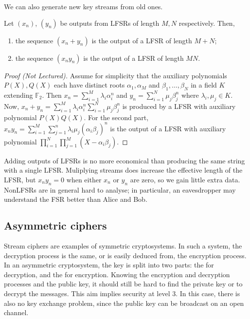 
We can also generate new key streams from old ones.
\begin{lemma}
    Let $(x_n)$, $(y_n)$ be outputs from LFSRs of length $M, N$ respectively.
    Then,
    \begin{enumerate}
        \item the sequence $(x_n + y_n)$ is the output of a LFSR of length $M + N$;
        \item the sequence $(x_n y_n)$ is the output of a LFSR of length $MN$.
    \end{enumerate}
\end{lemma}

\begin{proof}[Proof (Not Lectured)]
    Assume for simplicity that the auxiliary polynomials $P(X), Q(X)$ each have distinct roots $\alpha_1, \alpha_M$ and $\beta_1, \dots, \beta_N$ in a field $K$ extending $\mathbb F_2$.
    Then $x_n = \sum_{i=1}^M \lambda_i \alpha_i^n$ and $y_n = \sum_{i=1}^N \mu_j \beta_j^n$ where $\lambda_i, \mu_j \in K$.
    Now, $x_n + y_n = \sum_{i=1}^M \lambda_i \alpha_i^n \sum_{i=1}^N \mu_j \beta_j^n$ is produced by a LFSR with auxiliary polynomial $P(X) Q(X)$.
    For the second part, $x_n y_n = \sum_{i=1}^M \sum_{j=1}^n \lambda_i \mu_j (\alpha_i \beta_j)^n$ is the output of a LFSR with auxiliary polynomial $\prod_{i=1}^N \prod_{j=1}^M (X - \alpha_i \beta_j)$.
\end{proof}
Adding outputs of LFSRs is no more economical than producing the same string with a single LFSR.
Muliplying streams does increase the effective length of the LFSR, but $x_n y_n = 0$ when either $x_n$ or $y_n$ are zero, so we gain little extra data.
NonLFSRs are in general hard to analyse; in particular, an eavesdropper may understand the FSR better than Alice and Bob.

\subsection{Asymmetric ciphers}
Stream ciphers are examples of symmetric cryptosystems.
In such a system, the decryption process is the same, or is easily deduced from, the encryption process.
In an asymmetric cryptosystem, the key is split into two parts: the  for decryption, and the  for encryption.
Knowing the encryption and decryption processes and the public key, it should still be hard to find the private key or to decrypt the messages.
This aim implies security at level 3.
In this case, there is also no key exchange problem, since the public key can be broadcast on an open channel.

